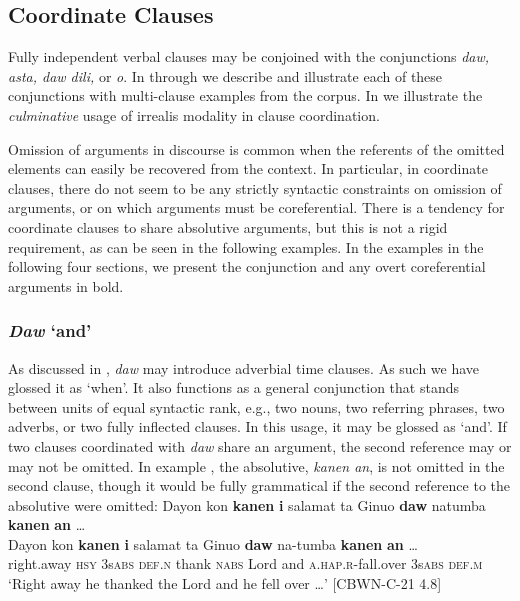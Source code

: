 \subsection{Coordinate Clauses}
\label{sec:coordinateclauses}
Fully independent verbal clauses may be conjoined with the conjunctions \textit{daw, asta, daw dili,} or \textit{o}. In  through  we describe and illustrate each of these conjunctions with multi-clause examples from the corpus. In  we illustrate the \textit{culminative} usage of irrealis modality in clause coordination. 

Omission of arguments in discourse is common when the referents of the omitted elements can easily be recovered from the context. In particular, in coordinate clauses, there do not seem to be any strictly syntactic constraints on omission of arguments, or on which arguments must be coreferential. There is a tendency for coordinate clauses to share absolutive arguments, but this is not a rigid requirement, as can be seen in the following examples. In the examples in the following four sections, we present the conjunction and any overt coreferential arguments in bold.

\subsubsection{\textit{Daw} ‘and’}
\label{sec:daw}
As discussed in , \textit{daw} may introduce adverbial time clauses. As such we have glossed it as ‘when’. It also functions as a general conjunction that stands between units of equal syntactic rank, e.g., two nouns, two referring phrases, two adverbs, or two fully inflected clauses. In this usage, it may be glossed as ‘and’.  If two clauses coordinated with \textit{daw} share an  argument, the second reference may or may not be omitted. In example , the absolutive, \textit{kanen an}, is not omitted in the second clause, though it would be fully grammatical if the second reference to the absolutive were omitted:
\ea
\label{ex:hefellover}
Dayon kon \textbf{kanen} \textbf{i} salamat ta Ginuo \textbf{daw} natumba \textbf{kanen} \textbf{an} … \\
\vspace{4pt}
\gll Dayon kon \textbf{kanen} \textbf{i} salamat ta Ginuo \textbf{daw} na-tumba \textbf{kanen} \textbf{an} … \\
right.away \textsc{hsy} 3s\textsc{abs} \textsc{def.n} thank \textsc{nabs} Lord and \textsc{a.hap.r}-fall.over 3s\textsc{abs} \textsc{def.m} \\
\glt ‘Right away he thanked the Lord and he fell over …’ [CBWN-C-21 4.8] 
\z

